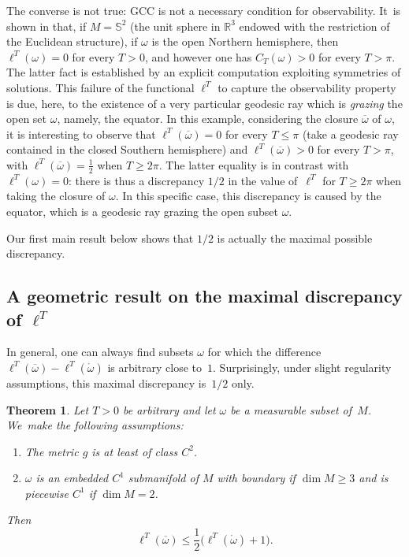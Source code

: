 \documentclass[JEP,XML,SOM,Unicode, NoEqCountersInSection,NoFloatCountersInSection,published]{cedram}
\newenvironment{enumeratei}
{\bgroup\def\theenumi{\roman{enumi}}\def\theenumii{\arabic{enumii}}\begin{enumerate}}
{\end{enumerate}\egroup}
\def\R{\mathbb{R}}
\newtheorem{theorem}{Theorem}
\theoremstyle{definition}
\begin{document}
The converse is not true: GCC is not a necessary condition for observability.
It~is shown in \cite{Lebeau_JEDP1992} that, if $M=\mathbb{S}^2$ (the unit sphere in $\R^3$ endowed with the restriction of the Euclidean structure), if $\omega$ is the open Northern hemisphere, then $\ell^T(\omega)=0$ for every $T>0$, and however one has $C_T(\omega)>0$ for every $T>\pi$. The latter fact is established by an explicit computation exploiting symmetries of solutions.
This failure of the functional $\ell^T$ to capture the observability property is due, here, to the existence of a very particular geodesic ray which is \emph{grazing} the open set $\omega$, namely, the equator.
In this example, considering the closure $\overline\omega$ of $\omega$, it is interesting to observe that $\ell^T(\overline\omega)=0$ for every $T\leq\pi$ (take a geodesic ray contained in the closed Southern hemisphere) and $\ell^T(\overline\omega)>0$ for every $T>\pi$, with $\ell^T(\overline\omega)=\frac{1}{2}$ when $T\geq 2\pi$. The latter equality is in contrast with $\ell^T(\omega)=0$: there is thus a discrepancy $1/2$ in the value of~$\ell^T$ for $T\geq 2\pi$ when taking the closure of $\omega$. In this specific case, this discrepancy is caused by the equator, which is a geodesic ray grazing the open subset $\omega$.

Our first main result below shows that $1/2$ is actually the maximal possible discrepancy.

\subsection{A geometric result on the maximal discrepancy of $\ell^T$}
In general, one can always find subsets $\omega$ for which the difference $\ell^T(\overline\omega)- \ell^T(\mathring{\omega})$ is arbitrary close to~$1$. Surprisingly, under slight regularity assumptions, this maximal discrepancy is~$1/2$ only.

\begin{theorem} \label{thm_geom}
Let $T>0$ be arbitrary and let $\omega$ be a measurable subset of~$M$.
We~make the following assumptions:
\begin{enumeratei}
\item\label{thm_geomi}
The metric $g$ is at least of class $C^2$.
\item\label{thm_geomii}
$\omega$ is an embedded $C^1$ submanifold of $M$ with boundary if $\dim M \geq 3$ and is piecewise $C^1$ if $\dim M=2$.
\end{enumeratei}
Then
\begin{equation}\label{mainineq}
\ell^T(\overline\omega) \leq \frac{1}{2}\bigl( \ell^T(\mathring{\omega}) + 1\bigr).
\end{equation}
\end{theorem}
\end{document}
